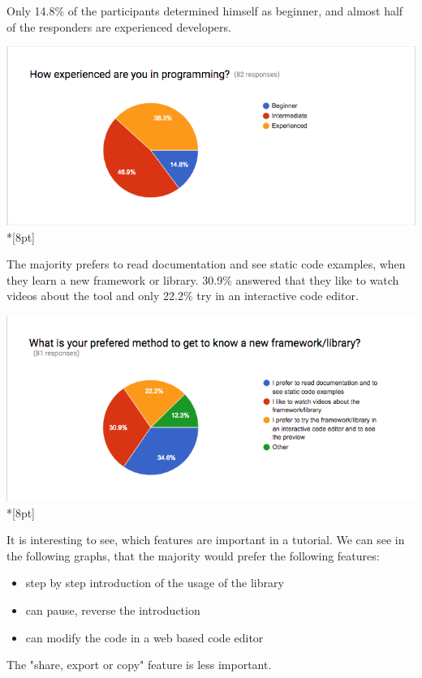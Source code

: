 \documentclass[12pt, a4paper, oneside, openright, medskipamount]{report}
\begin{document}
Only 14.8\% of the participants determined himself as beginner, and almost half of the responders are experienced developers.

\includegraphics[width=1\textwidth]{assets/survey-result/how-experienced.png}\\*[8pt]

The majority prefers to read documentation and see static code examples, when they learn a new framework or library. 30.9\% answered that they like to watch videos about the tool and only 22.2\% try in an interactive code editor.

\includegraphics[width=1\textwidth]{assets/survey-result/prefered-method.png}\\*[8pt]

It is interesting to see, which features are important in a tutorial. We can see in the following graphs, that the majority would prefer the following features:
\begin{itemize}[noitemsep]
\item step by step introduction of the usage of the library
\item can pause, reverse the introduction
\item can modify the code in a web based code editor
\end{itemize}

The "share, export or copy" feature is less important.
\end{document}
